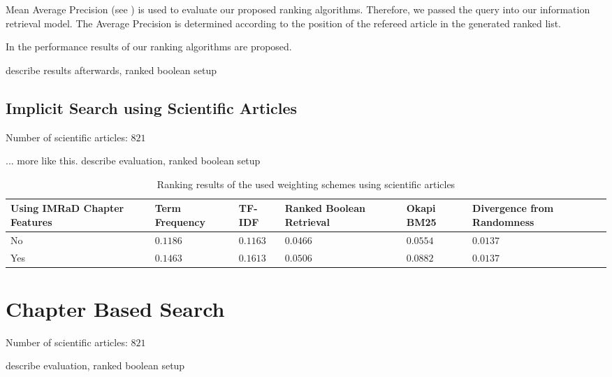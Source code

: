 Mean Average Precision (see ) is used to evaluate our proposed ranking algorithms. Therefore, we passed the query into our information retrieval model. The Average Precision is determined according to the position of the refereed article in the generated ranked list.

In  the performance results of our ranking algorithms are proposed. %


describe results afterwards, ranked boolean setup

\subsection{Implicit Search using Scientific Articles}

Number of scientific articles: $821$

... more like this. describe evaluation, ranked boolean setup

\begin{table}[b]
    \centering
    \begin{tabular}{ C{2.1cm} C{2.1cm} C{2.1cm} C{2.1cm} C{2.1cm} C{2.1cm} }
      \toprule
      \textbf{Using IMRaD Chapter Features} & \textbf{Term Frequency} & \textbf{TF-IDF} & \textbf{Ranked Boolean Retrieval} & \textbf{Okapi BM25} & \textbf{Divergence from Randomness} \\ \midrule
      No  & $0.1186$ & $0.1163$ & $0.0466$ & $0.0554$ & $0.0137$ \\
      Yes & $0.1463$ & $0.1613$ & $0.0506$ & $0.0882$ & $0.0137$ \\
      \bottomrule
    \end{tabular}
  \caption[Ranking results using scientific articles]{Ranking results of the used weighting schemes using scientific articles}
  \label{tbl:ranking_result_full}
\end{table}


\section{Chapter Based Search}

Number of scientific articles: $821$

describe evaluation, ranked boolean setup

